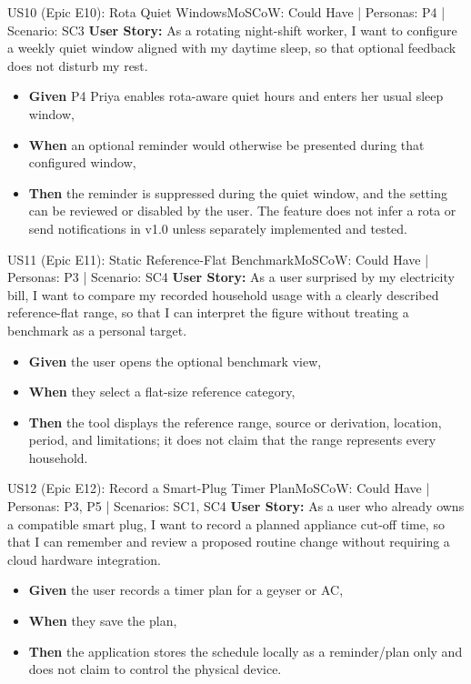\documentclass[12pt,a4paper]{article}
\begin{document}
\begin{storybox}{US10 (Epic E10): Rota Quiet Windows}{MoSCoW: Could Have | Personas: P4 | Scenario: SC3}
\textbf{User Story:} As a rotating night-shift worker, I want to configure a weekly quiet window aligned with my daytime sleep, so that optional feedback does not disturb my rest.
\begin{itemize}
    \item \textbf{Given} P4 Priya enables rota-aware quiet hours and enters her usual sleep window,
    \item \textbf{When} an optional reminder would otherwise be presented during that configured window,
    \item \textbf{Then} the reminder is suppressed during the quiet window, and the setting can be reviewed or disabled by the user. The feature does not infer a rota or send notifications in v1.0 unless separately implemented and tested.
\end{itemize}
\end{storybox}


\begin{storybox}{US11 (Epic E11): Static Reference-Flat Benchmark}{MoSCoW: Could Have | Personas: P3 | Scenario: SC4}
\textbf{User Story:} As a user surprised by my electricity bill, I want to compare my recorded household usage with a clearly described reference-flat range, so that I can interpret the figure without treating a benchmark as a personal target.
\begin{itemize}
    \item \textbf{Given} the user opens the optional benchmark view,
    \item \textbf{When} they select a flat-size reference category,
    \item \textbf{Then} the tool displays the reference range, source or derivation, location, period, and limitations; it does not claim that the range represents every household.
\end{itemize}
\end{storybox}

\begin{storybox}{US12 (Epic E12): Record a Smart-Plug Timer Plan}{MoSCoW: Could Have | Personas: P3, P5 | Scenarios: SC1, SC4}
\textbf{User Story:} As a user who already owns a compatible smart plug, I want to record a planned appliance cut-off time, so that I can remember and review a proposed routine change without requiring a cloud hardware integration.
\begin{itemize}
    \item \textbf{Given} the user records a timer plan for a geyser or AC,
    \item \textbf{When} they save the plan,
    \item \textbf{Then} the application stores the schedule locally as a reminder/plan only and does not claim to control the physical device.
\end{itemize}
\end{storybox}
\end{document}
